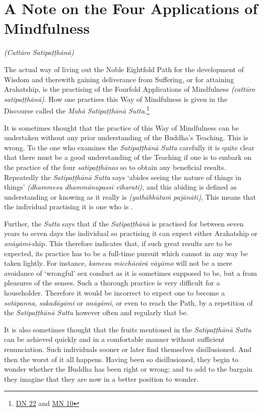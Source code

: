 \chapter{A Note on the Four Applications of Mindfulness}

\emph{(Cattāro Satipaṭṭhānā)}

\protect\hypertarget{start}{}{}The actual way of living out the Noble Eightfold Path for the development of Wisdom and therewith gaining deliverance from Suffering, or for attaining Arahatship, is the practising of the Fourfold Applications of Mindfulness \emph{(cattāro satipaṭṭhānā)}. How one practises this Way of Mindfulness is given in the Discourse called the \emph{Mahā Satipaṭṭhānā Sutta}.\footnote{\href{https://suttacentral.net/dn22/en/sujato}{DN 22} and \href{https://suttacentral.net/mn10/en/sujato}{MN 10}}

It is sometimes thought that the practice of this Way of Mindfulness can be undertaken without any prior understanding of the Buddha's Teaching. This is wrong. To the one who examines the \emph{Satipaṭṭhānā Sutta} carefully it is quite clear that there must be a good understanding of the Teaching if one is to embark on the practice of the four \emph{satipaṭṭhānas} so to obtain any beneficial results. Repeatedly the \emph{Satipaṭṭhānā Sutta} says `abides seeing the nature of things in things' \emph{(dhammesu dhammānupassī viharati)}, and this abiding is defined as understanding or knowing as it really is \emph{(yathābhūtaṁ pajānāti)}, This means that the individual practising it is one who is .

Further, the \emph{Sutta} says that if the \emph{Satipaṭṭhānā} is practised for between seven years to seven days the individual so practising it can expect either Arahatship or \emph{anāgāmi}-ship. This therefore indicates that, if such great results are to be expected, its practice has to be a full-time pursuit which cannot in any way be taken lightly. For instance, \emph{kamesu micchācārā vāyāmo} will not be a mere avoidance of `wrongful' sex conduct as it is sometimes supposed to be, but a  from  pleasures of the senses. Such a thorough practice is very difficult for a householder. Therefore it would be incorrect to expect one to become a \emph{sotāpanna}, \emph{sakadāgāmi} or \emph{anāgāmi}, or even to reach the Path, by a repetition of the \emph{Satipaṭṭhānā Sutta} however often and regularly that be.

It is also sometimes thought that the fruits mentioned in the \emph{Satipaṭṭhānā Sutta} can be achieved quickly and in a comfortable manner without sufficient renunciation. Such individuals sooner or later find themselves disillusioned. And then the worst of it all happens. Having been so disillusioned, they begin to wonder whether the Buddha has been right or wrong; and to add to the bargain they imagine that they are now in a better position to wonder.

